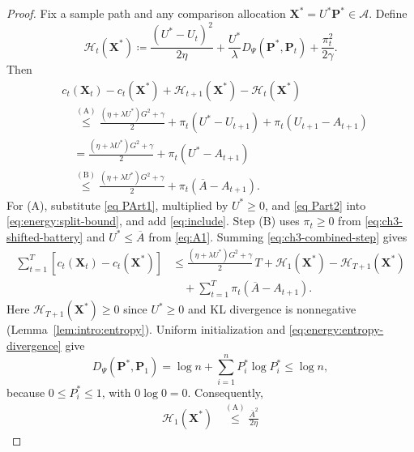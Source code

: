 \begin{proof}
Fix a sample path and any comparison allocation
$\mathbf X^*=U^*\mathbf P^*\in\mathcal A$. Define
\begin{equation}
\label{eq:ch3-comparison-potential}
  \mathcal H_t(\mathbf{X}^*)
  \coloneqq\frac{(U^*-U_t)^2}{2\eta}
   +\frac{U^*}{\lambda}D_\Psi(\mathbf{P}^*,\mathbf{P}_t)
   +\frac{\pi_t^2}{2\gamma}.
\end{equation}
Then
\begin{equation}\label{eq:ch3-combined-step}
\begin{aligned}
 &c_t(\mathbf X_t)-c_t(\mathbf X^*)
   +\mathcal H_{t+1}(\mathbf X^*)-\mathcal H_t(\mathbf X^*)\\
 &\quad\overset{\mathrm{(A)}}{\leq}
   \frac{(\eta+\lambda U^*)G^2+\gamma}{2}
   +\pi_t(U^*-U_{t+1})+\pi_t(U_{t+1}-A_{t+1})\\
 &\quad=\frac{(\eta+\lambda U^*)G^2+\gamma}{2}
   +\pi_t(U^*-A_{t+1})\\
 &\quad\overset{\mathrm{(B)}}{\leq}
   \frac{(\eta+\lambda U^*)G^2+\gamma}{2}
   +\pi_t(\overline A-A_{t+1}).
\end{aligned}
\end{equation}
For (A), substitute \eqref{eq PArt1}, multiplied by $U^*\geq0$,
and \eqref{eq Part2} into \eqref{eq:energy:split-bound}, and add
\eqref{eq:include}. Step (B) uses $\pi_t\geq0$ from
\eqref{eq:ch3-shifted-battery} and $U^*\leq\overline A$ from \eqref{eq:A1}.
Summing \eqref{eq:ch3-combined-step} gives
\begin{equation}\label{eq:energy:comparison-sum}
\begin{aligned}
 \sum_{t=1}^T[c_t(\mathbf X_t)-c_t(\mathbf X^*)]
 &\leq\frac{(\eta+\lambda U^*)G^2+\gamma}{2}\,T
   +\mathcal H_1(\mathbf X^*)-\mathcal H_{T+1}(\mathbf X^*)\\
 &\quad+\sum_{t=1}^T\pi_t(\overline A-A_{t+1}).
\end{aligned}
\end{equation}
Here $\mathcal H_{T+1}(\mathbf X^*)\geq0$ since $U^*\geq0$ and
KL divergence is nonnegative (Lemma~\ref{lem:intro:entropy}).
Uniform initialization and \eqref{eq:energy:entropy-divergence} give
\[
 D_\Psi(\mathbf P^*,\mathbf P_1)
 =\log n+\sum_{i=1}^n P_i^*\log P_i^*\leq\log n,
\]
because $0\leq P_i^*\leq1$, with $0\log0=0$. Consequently,
\begin{equation}\label{eq:energy:initial-comparison-potential}
\begin{aligned}
 \mathcal H_1(\mathbf X^*)
 &\overset{\mathrm{(A)}}{\leq}\frac{\overline A^2}{2\eta}

\end{aligned}
\end{equation}
\end{proof}
